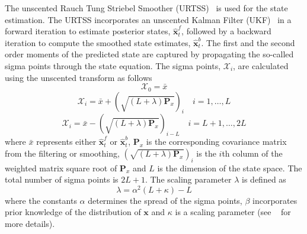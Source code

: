 \documentclass[12pt]{iopart}
\begin{document}
The unscented Rauch Tung Striebel Smoother (URTSS)~\cite{Sarkka2010} is used for the state estimation. The URTSS incorporates an unscented Kalman Filter (UKF)~\cite{Julier1997, Merwe2003} in a forward iteration to estimate posterior states, $\hat{\mathbf x}_t^{f}$, followed by a backward iteration to compute the smoothed state estimates, $\hat{\mathbf x}_t^{b}$. The first and the second order moments of the predicted state are captured by propagating the so-called sigma points through the state equation. The sigma points, $\mathcal X_i$, are calculated using the unscented transform as follows
\begin{equation}\label{eq:sigmapoints1}
	\mathcal X_{0}=\bar x 
\end{equation}
\begin{equation}
	\mathcal X_{i}=\bar x+(\sqrt{( L + \lambda)\mathbf P_x})_i \quad i=1, \dots, L 
\end{equation}
\begin{equation}\label{eq:sigmapoints2}
	\mathcal X_{i}=\bar x-(\sqrt{( L + \lambda)\mathbf P_x})_{i- L} \quad i= L+1, \dots, 2 L 
\end{equation}
where $\bar x$ represents either $\hat{\mathbf x}_t^{f}$ or $\hat{\mathbf x}_t^{b}$, $\mathbf{P}_x$ is the corresponding covariance matrix from the filtering or smoothing, $(\sqrt{( L + \lambda)\mathbf P_x})_i$ is the $i$th column of the weighted matrix square root of $\mathbf P_x$ and $L$ is the dimension of the state space. The total number of sigma points is $2L+1$. The scaling parameter $\lambda$ is defined as 
\begin{equation}\label{eq:sigmapoints3}
	\lambda=\alpha^2( L+\kappa) - L 
\end{equation}
where the constants $\alpha$ determines the spread of the sigma points, $\beta$ incorporates prior knowledge of the distribution of $\mathbf{x}$ and $\kappa$ is a scaling parameter (see ~\cite{Haykin2001} for more details). 
\end{document}
